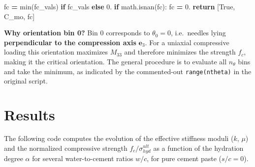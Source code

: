 \documentclass[
  a4paper,
  numbers=noendperiod,
  DIV=12]{scrreprt}
\newenvironment{Shaded}{\begin{snugshade}}{\end{snugshade}}
\newcommand{\BuiltInTok}[1]{#1}
\newcommand{\ControlFlowTok}[1]{\textcolor[rgb]{0.13,0.29,0.53}{\textbf{#1}}}
\newcommand{\FloatTok}[1]{\textcolor[rgb]{0.00,0.00,0.81}{#1}}
\newcommand{\NormalTok}[1]{#1}
\newcommand{\OperatorTok}[1]{\textcolor[rgb]{0.81,0.36,0.00}{\textbf{#1}}}
\newcommand{\VariableTok}[1]{\textcolor[rgb]{0.00,0.00,0.00}{#1}}
\newcommand{\uu}[1]{{\symbf{{#1}}}}
\begin{document}
\begin{Shaded}
\begin{Highlighting}[]
\NormalTok{    fc }\OperatorTok{=} \BuiltInTok{min}\NormalTok{(fc\_vals) }\ControlFlowTok{if}\NormalTok{ fc\_vals }\ControlFlowTok{else} \FloatTok{0.}
    \ControlFlowTok{if}\NormalTok{ math.isnan(fc):}
\NormalTok{        fc }\OperatorTok{=} \FloatTok{0.}
    \ControlFlowTok{return}\NormalTok{ [}\VariableTok{True}\NormalTok{, C\_mo, fc]}
\end{Highlighting}
\end{Shaded}

\begin{tcolorbox}[enhanced jigsaw, arc=.35mm, bottomrule=.15mm, bottomtitle=1mm, breakable, colback=white, colbacktitle=quarto-callout-note-color!10!white, colframe=quarto-callout-note-color-frame, coltitle=black, left=2mm, leftrule=.75mm, opacityback=0, opacitybacktitle=0.6, rightrule=.15mm, title=\textcolor{quarto-callout-note-color}{\faInfo}\hspace{0.5em}{Note}, titlerule=0mm, toprule=.15mm, toptitle=1mm]

\textbf{Why orientation bin 0?} Bin 0 corresponds to \(\theta_0 = 0\),
i.e.~needles lying \textbf{perpendicular to the compression axis}
\(\uu{e}_3\). For a uniaxial compressive loading this orientation
maximizes \(M_{33}\) and therefore minimizes the strength \(f_c\),
making it the critical orientation. The general procedure is to evaluate
all \(n_\theta\) bins and take the minimum, as indicated by the
commented-out \texttt{range(ntheta)} in the original script.

\end{tcolorbox}

\section{Results}\label{sec-pichler-results}

The following code computes the evolution of the effective stiffness
moduli (\(k\), \(\mu\)) and the normalized compressive strength
\(f_c/\sigma^{ult}_{hyd}\) as a function of the hydration degree
\(\alpha\) for several water-to-cement ratios \(w/c\), for pure cement
paste (\(s/c=0\)).
\end{document}

